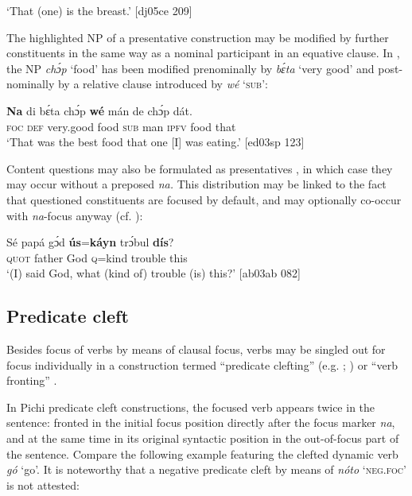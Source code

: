 \glt ‘That (one) is the breast.’ [dj05ce 209]
\z

The highlighted NP of a presentative construction may be modified by further constituents in the same way as a nominal participant in an equative clause. In , the NP \textit{chɔ́p} ‘food’ has been modified prenominally by \textit{bɛ́ta} ‘very good’ and post-nominally by a relative clause{\fff} introduced by \textit{wé} ‘\textsc{sub}’: 


\ea%
    \label{ex:key:730}
    \gll \textbf{Na}  di  bɛ́ta      chɔ́p  \textbf{wé}  mán    de  chɔ́p  dát.\\
\textsc{foc}  \textsc{def}  very.good  food    \textsc{sub}  man    \textsc{ipfv}  food    that\\

\glt ‘That was the best food that one [I] was eating.’ [ed03sp 123]
\z

Content questions may also be formulated as presentatives , in which case they may occur without a preposed \textit{na.} This distribution may be linked to the fact that questioned constituents are focused by default, and may optionally co-occur with \textit{na}{}-focus anyway (cf. ):


\ea%
    \label{ex:key:731}
    \gll Sé  papá  gɔ́d  \textbf{ús}=\textbf{káyn}  trɔ́bul  \textbf{dís}?\\
\textsc{quot}  father  God  \textsc{q}=kind  trouble  this\\

\glt ‘(I) said God, what (kind of) trouble (is) this?’ [ab03ab 082]
\z

\subsection{Predicate cleft}\label{sec:7.4.5}

Besides focus of verbs by means of clausal focus, verbs may be singled out for focus individually in a construction termed “predicate clefting” (e.g. \citealt{Koopman1984}; \citealt{LarsonLefebvre1991}) or “verb fronting” \citep{Muysken1978}.


In Pichi predicate cleft constructions, the focused verb appears twice in the sentence: fronted in the initial focus position directly after the focus marker \textit{na}, and at the same time in its original syntactic position in the out-of-focus part of the sentence. Compare the following example featuring the clefted dynamic verb \textit{gó} ‘go’. It is noteworthy that a negative predicate cleft by means of \textit{nóto} ‘\textsc{neg.foc}’ is not attested: 



